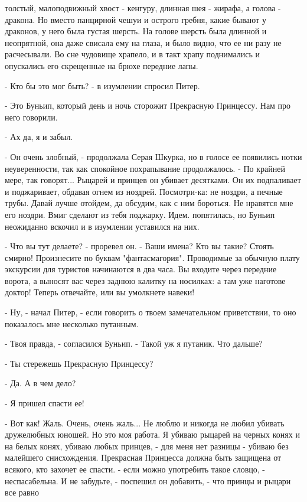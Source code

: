 толстый, малоподвижный хвост - кенгуру, длинная шея - жирафа, а голова 
- дракона. Но вместо панцирной чешуи и острого гребня, какие бывают у 
драконов, у него была густая шерсть. На голове шерсть была длинной и 
неопрятной, она даже свисала ему на глаза, и было видно, что ее ни 
разу не расчесывали. Во сне чудовище храпело, и в такт храпу 
поднимались и опускались его скрещенные на брюхе передние лапы.
\par- Кто бы это мог быть? - в изумлении спросил Питер.
\par- Это Буньип, который день и ночь сторожит Прекрасную Принцессу. 
Нам про него говорили.
\par- Ах да, я и забыл.
\par- Он очень злобный, - продолжала Серая Шкурка, но в голосе ее 
появились нотки неуверенности, так как спокойное похрапывание 
продолжалось. - По крайней мере, так говорят... Рыцарей и принцев он 
убивает десятками. Он их подпаливает и поджаривает, обдавая огнем из 
ноздрей. Посмотри-ка: не ноздри, а печные трубы. Давай лучше отойдем, 
да обсудим, как с ним бороться. Не нравятся мне его ноздри. Вмиг 
сделают из тебя поджарку. Идем.
 попятилась, но Буньип неожиданно вскочил и в изумлении 
уставился на них.
\par- Что вы тут делаете? - проревел он. - Ваши имена? Кто вы такие? 
Стоять смирно! Произнесите по буквам "фантасмагория". Проводимые за 
обычную плату экскурсии для туристов начинаются в два часа. Вы входите 
через передние ворота, а выносят вас через заднюю калитку на носилках: 
а там уже наготове доктор! Теперь отвечайте, или вы умолкнете навеки!
\par- Ну, - начал Питер, - если говорить о твоем замечательном 
приветствии, то оно показалось мне несколько путанным.
\par- Твоя правда, - согласился Буньип. - Такой уж я путаник. Что 
дальше?
\par- Ты стережешь Прекрасную Принцессу?
\par- Да. А в чем дело?
\par- Я пришел спасти ее!
\par- Вот как! Жаль. Очень, очень жаль... Не люблю и никогда не любил 
убивать дружелюбных юношей. Но это моя работа. Я убиваю рыцарей на 
черных конях и на белых конях, убиваю любых принцев, - для меня нет 
разницы - убиваю без малейшего снисхождения. Прекрасная Принцесса 
должна быть защищена от всякого, кто захочет ее спасти.
 - если можно употребить такое словцо, - неспасабельна. И не 
забудьте, - поспешил он добавить, - что принцы и рыцари все равно 
